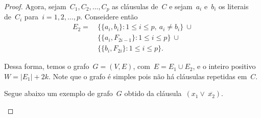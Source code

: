 \begin{proof}
		\bigskip 



		Agora, sejam~$C_1,C_2,\ldots,C_p$ as cláusulas de~$C$ e sejam~$a_i$
		e~$b_i$ os literais de~$C_i$ para~$i=1,2,\ldots,p$.
		Conseidere então
		\begin{align}
			E_2= \ &\{ \{a_i,b_i\}: 1\le i\le p,\ a_i\ne b_i \}\ \cup 
					\nonumber\\
				&\{\{a_i, F_{2i-1}\}: 1\le i\le p\}\ \cup \nonumber \\
				&\{\{b_i, F_{2i}\}: 1\le i\le p\}. \nonumber
		\end{align}


		Dessa forma, temos o grafo~${G = (V,E)}$, com~${E=E_1\cup E_2}$,
		e o inteiro positivo~${W = |E_1|+2k}$.
		Note que o grafo é simples pois não há cláusulas repetidas em~$C$.

		Segue abaixo um exemplo de grafo~$G$ obtido da
		cláusula~${(x_1\lor\ \overline{x_2})}$.

		\bigskip

		\begin{center} 
\end{center}
\end{proof}
